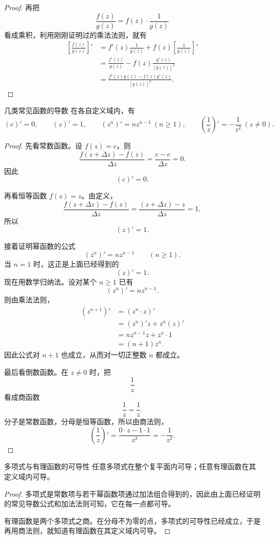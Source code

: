 \begin{proof}
再把
\[
    \frac{f(z)}{g(z)}=f(z)\cdot \frac{1}{g(z)}
\]
看成乘积，利用刚刚证明过的乘法法则，就有
\begin{align*}
    \left[\frac{f(z)}{g(z)}\right]'
    &=f'(z)\frac{1}{g(z)}+f(z)\left[\frac{1}{g(z)}\right]'\\
    &=\frac{f'(z)}{g(z)}-f(z)\frac{g'(z)}{[g(z)]^2}\\
    &=\frac{f'(z)g(z)-f(z)g'(z)}{[g(z)]^2}.
\end{align*}
\end{proof}

\begin{dingli}{几类常见函数的导数}{}
在各自定义域内，有
\[
    (c)'=0,\qquad (z)'=1,\qquad (z^n)'=nz^{n-1}\ (n\ge 1),\qquad
    \left(\frac{1}{z}\right)'=-\frac{1}{z^2}\ (z\neq 0).
\]
\end{dingli}

\begin{proof}
先看常数函数。设 $f(z)=c$，则
\[
    \frac{f(z+\Delta z)-f(z)}{\Delta z}
    =\frac{c-c}{\Delta z}=0.
\]
因此
\[
    (c)'=0.
\]

再看恒等函数 $f(z)=z$。由定义，
\[
    \frac{f(z+\Delta z)-f(z)}{\Delta z}
    =\frac{(z+\Delta z)-z}{\Delta z}=1,
\]
所以
\[
    (z)'=1.
\]

接着证明幂函数的公式
\[
    (z^n)'=nz^{n-1}\qquad (n\ge 1).
\]
当 $n=1$ 时，这正是上面已经得到的
\[
    (z)'=1.
\]
现在用数学归纳法。设对某个 $n\ge 1$ 已有
\[
    (z^n)'=nz^{n-1}.
\]
则由乘法法则，
\begin{align*}
    (z^{n+1})'
    &=(z^n\cdot z)'\\
    &=(z^n)'z+z^n(z)'\\
    &=nz^{n-1}z+z^n\cdot 1\\
    &=(n+1)z^n.
\end{align*}
因此公式对 $n+1$ 也成立，从而对一切正整数 $n$ 都成立。

最后看倒数函数。在 $z\neq 0$ 时，把
\[
    \frac{1}{z}
\]
看成商函数
\[
    \frac{1}{z}=\frac{1}{z}.
\]
分子是常数函数，分母是恒等函数，所以由商法则，
\[
    \left(\frac{1}{z}\right)'
    =\frac{0\cdot z-1\cdot 1}{z^2}
    =-\frac{1}{z^2}.
\]
\end{proof}

\begin{tuilun}{多项式与有理函数的可导性}{}
任意多项式在整个复平面内可导；任意有理函数在其定义域内可导。
\end{tuilun}

\begin{proof}
多项式是常数项与若干幂函数项通过加法组合得到的，因此由上面已经证明的常见导数公式和加法法则可知，它在每一点都可导。

有理函数是两个多项式之商。在分母不为零的点，多项式的可导性已经成立，于是再用商法则，就知道有理函数在其定义域内可导。
\end{proof}

